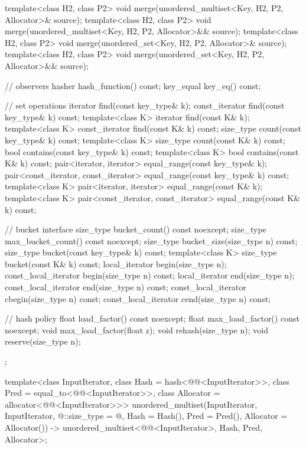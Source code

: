 \begin{codeblock}
{{    template<class H2, class P2>
      void merge(unordered_multiset<Key, H2, P2, Allocator>& source);
    template<class H2, class P2>
      void merge(unordered_multiset<Key, H2, P2, Allocator>&& source);
    template<class H2, class P2>
      void merge(unordered_set<Key, H2, P2, Allocator>& source);
    template<class H2, class P2>
      void merge(unordered_set<Key, H2, P2, Allocator>&& source);

    // observers
    hasher hash_function() const;
    key_equal key_eq() const;

    // set operations
    iterator         find(const key_type& k);
    const_iterator   find(const key_type& k) const;
    template<class K>
      iterator       find(const K& k);
    template<class K>
      const_iterator find(const K& k) const;
    size_type        count(const key_type& k) const;
    template<class K>
      size_type      count(const K& k) const;
    bool             contains(const key_type& k) const;
    template<class K>
      bool           contains(const K& k) const;
    pair<iterator, iterator>               equal_range(const key_type& k);
    pair<const_iterator, const_iterator>   equal_range(const key_type& k) const;
    template<class K>
      pair<iterator, iterator>             equal_range(const K& k);
    template<class K>
      pair<const_iterator, const_iterator> equal_range(const K& k) const;

    // bucket interface
    size_type bucket_count() const noexcept;
    size_type max_bucket_count() const noexcept;
    size_type bucket_size(size_type n) const;
    size_type bucket(const key_type& k) const;
    template<class K> size_type bucket(const K& k) const;
    local_iterator begin(size_type n);
    const_local_iterator begin(size_type n) const;
    local_iterator end(size_type n);
    const_local_iterator end(size_type n) const;
    const_local_iterator cbegin(size_type n) const;
    const_local_iterator cend(size_type n) const;

    // hash policy
    float load_factor() const noexcept;
    float max_load_factor() const noexcept;
    void max_load_factor(float z);
    void rehash(size_type n);
    void reserve(size_type n);
  };

  template<class InputIterator,
           class Hash = hash<@@<InputIterator>>,
           class Pred = equal_to<@@<InputIterator>>,
           class Allocator = allocator<@@<InputIterator>>>
    unordered_multiset(InputIterator, InputIterator, @\seebelow@::size_type = @\seebelow@,
                       Hash = Hash(), Pred = Pred(), Allocator = Allocator())
      -> unordered_multiset<@@<InputIterator>,
                            Hash, Pred, Allocator>;

}
\end{codeblock}
